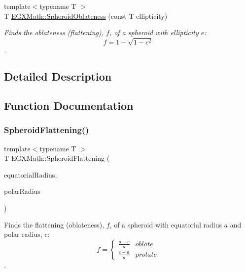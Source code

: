 \begin{DoxyCompactItemize}
{\footnotesize template$<$typename T $>$ }\\T \mbox{\hyperlink{group___e_g_x_math-_geometry-3_d-_spheroid-_flattening_gaf2530de595124e75a7f58482d617cfce}{E\+G\+X\+Math\+::\+Spheroid\+Oblateness}} (const T ellipticity)
\begin{DoxyCompactList}\small\item\em Finds the oblateness (flattening), $f$, of a spheroid with ellipticity $e$\+: \[ f = 1 - \sqrt{1-e^2} \]. \end{DoxyCompactList}\end{DoxyCompactItemize}


\subsection{Detailed Description}


\subsection{Function Documentation}
\mbox{\label{group___e_g_x_math-_geometry-3_d-_spheroid-_flattening_ga640f4bcd86aa4c378819bffda31c0852}} 
\subsubsection{\texorpdfstring{Spheroid\+Flattening()}{SpheroidFlattening()}\hspace{0.1cm}{\footnotesize\ttfamily [1/2]}}
{\footnotesize\ttfamily template$<$typename T $>$ \\
T E\+G\+X\+Math\+::\+Spheroid\+Flattening (\begin{DoxyParamCaption}\item[{const T}]{equatorial\+Radius,  }\item[{const T}]{polar\+Radius }\end{DoxyParamCaption})}



Finds the flattening (oblateness), $f$, of a spheroid with equatorial radius $a$ and polar radius, $c$\+: \[ f =\begin{cases} \frac{a-c}{a}{} & oblate \\ \frac{c-a}{a} & prolate \end{cases} \]. 


